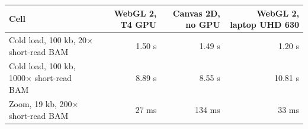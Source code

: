\begin{tabular}{@{}lrrr@{}}
\toprule
Cell & WebGL 2, T4 GPU & Canvas 2D, no GPU & WebGL 2, laptop UHD 630 \\
\midrule
Cold load, 100 kb, 20$\times$ short-read BAM & 1.50 s & 1.49 s & 1.20 s \\
Cold load, 100 kb, 1000$\times$ short-read BAM & 8.89 s & 8.55 s & 10.81 s \\
Zoom, 19 kb, 200$\times$ short-read BAM & 27 ms & 134 ms & 33 ms \\
\bottomrule
\end{tabular}
